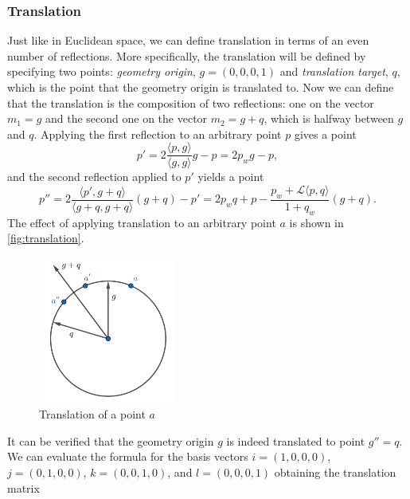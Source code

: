 \subsubsection{Translation}
Just like in Euclidean space, we can define translation in terms of an even number of reflections.
More specifically, the translation will be defined by specifying two points: \textit{geometry origin}, $g = (0, 0, 0, 1)$ and \textit{translation target}, $q$, which is the point that the geometry origin is translated to.
Now we can define that the translation is the composition of two reflections: one on the vector $m_1 = g$ and the second one on the vector $m_2 = g + q$, which is halfway between $g$ and $q$.
Applying the first reflection to an arbitrary point $p$ gives a point
$$p' = 2 \frac{\langle p, g \rangle}{\langle g, g \rangle}g - p = 2p_w g - p,$$
and the second reflection applied to $p'$ yields a point
\begin{equation} \label{eq:translation}
    p'' = 2 \frac{\langle p', g + q \rangle}{\langle g + q, g + q \rangle}(g + q) - p'
    = 2 p_w q + p - \frac{p_w + \mathcal{L}\langle p, q \rangle}{1 + q_w}(g + q).
\end{equation}
The effect of applying translation to an arbitrary point $a$ is shown in \autoref{fig:translation}.\\
\begin{figure}[!htb]
    \centering
    \includegraphics[width=0.4\textwidth]{chapters/theoretical_foundations/sections/non-eudlidean-spaces/resources/translation.png}
    \caption{Translation of a point $a$}
    \label{fig:translation}
\end{figure}
It can be verified that the geometry origin $g$ is indeed translated to point $g'' = q$.
We can evaluate the formula for the basis vectors $i = (1, 0, 0, 0)$, $j = (0, 1, 0, 0)$, $k = (0, 0, 1, 0)$, and $l = (0, 0, 0, 1)$ obtaining the translation matrix
